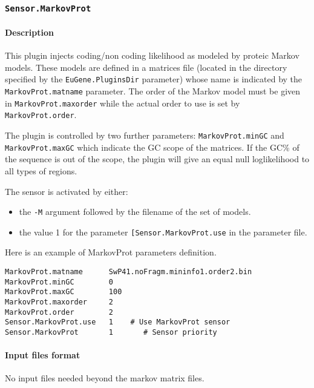 
\subsubsection{\texttt{Sensor.MarkovProt}}

\paragraph{Description}

This plugin injects coding/non coding likelihood as modeled by proteic
Markov models. These models are defined in a matrices file (located in
the directory specified by the \texttt{EuGene.PluginsDir} parameter)
whose name is indicated by the \texttt{MarkovProt.matname} parameter.
The order of the Markov model must be given in
\texttt{MarkovProt.maxorder} while the actual order to use is set by
\texttt{MarkovProt.order}.

The plugin is controlled by two further parameters:
\texttt{MarkovProt.minGC} and \texttt{MarkovProt.maxGC} which indicate
the GC scope of the matrices. If the GC\% of the sequence is out of
the scope, the plugin will give an equal null loglikelihood to all types
of regions.


The sensor is activated by either:
\begin{itemize}
\item the \texttt{-M} argument followed by the filename of the set of models.
\item the value 1 for the parameter \texttt{[Sensor.MarkovProt.use} in
  the parameter file.
\end{itemize}

Here is an example of MarkovProt parameters definition.
\begin{Verbatim}[fontsize=\small]
MarkovProt.matname      SwP41.noFragm.mininfo1.order2.bin
MarkovProt.minGC        0
MarkovProt.maxGC        100
MarkovProt.maxorder     2
MarkovProt.order        2
Sensor.MarkovProt.use   1    # Use MarkovProt sensor
Sensor.MarkovProt       1       # Sensor priority
\end{Verbatim}

\paragraph{Input files format}

No input files  needed beyond the markov matrix files.

